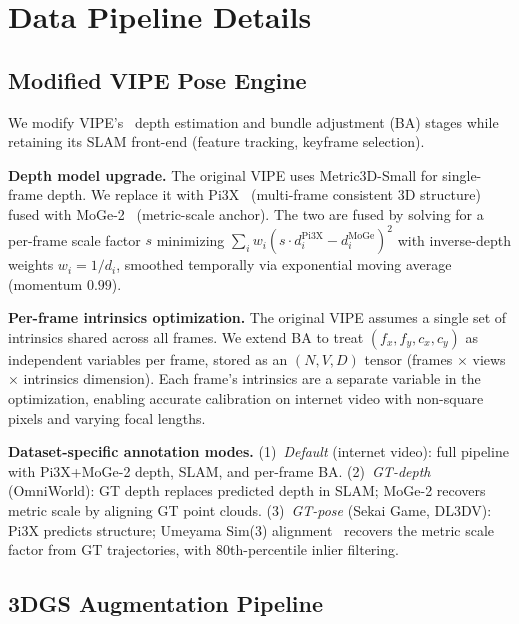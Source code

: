 \section{Data Pipeline Details}
\label{sec:appendix_data}




\subsection{Modified VIPE Pose Engine}
\label{sec:appendix_vipe}

We modify VIPE's~\citep{vipe} depth estimation and bundle adjustment (BA) stages while retaining its SLAM front-end (feature tracking, keyframe selection).

\noindent\textbf{Depth model upgrade.}
The original VIPE uses Metric3D-Small for single-frame depth.
We replace it with Pi3X~\citep{pi3x} (multi-frame consistent 3D structure) fused with MoGe-2~\citep{moge2} (metric-scale anchor).
The two are fused by solving for a per-frame scale factor $s$ minimizing $\sum_i w_i (s \cdot d^\text{Pi3X}_i - d^\text{MoGe}_i)^2$ with inverse-depth weights $w_i = 1/d_i$, smoothed temporally via exponential moving average (momentum $0.99$).

\noindent\textbf{Per-frame intrinsics optimization.}
The original VIPE assumes a single set of intrinsics shared across all frames.
We extend BA to treat $(f_x, f_y, c_x, c_y)$ as independent variables per frame, stored as an $(N, V, D)$ tensor (frames $\times$ views $\times$ intrinsics dimension).
Each frame's intrinsics are a separate variable in the optimization, enabling accurate calibration on internet video with non-square pixels and varying focal lengths.

\noindent\textbf{Dataset-specific annotation modes.}
(1)~\emph{Default} (internet video): full pipeline with Pi3X+MoGe-2 depth, SLAM, and per-frame BA.
(2)~\emph{GT-depth} (OmniWorld): GT depth replaces predicted depth in SLAM; MoGe-2 recovers metric scale by aligning GT point clouds.
(3)~\emph{GT-pose} (Sekai Game, DL3DV): Pi3X predicts structure; Umeyama Sim(3) alignment~\citep{umeyama} recovers the metric scale factor from GT trajectories, with 80th-percentile inlier filtering.

\subsection{3DGS Augmentation Pipeline}
\label{sec:appendix_3dgs}

